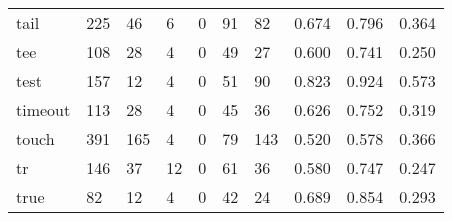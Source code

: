 \begin{longtable}{lp{2.0cm}p{2.0cm}p{2.0cm}p{2.0cm}p{2.0cm}p{2.0cm}p{2.0cm}p{2.0cm}p{2.0cm}}
tail      &                    225 &                                 46 &                                 6 &                                0 &                                91 &                              82 &                                0.674 &                                  0.796 &                                0.364 \\
tee       &                    108 &                                 28 &                                 4 &                                0 &                                49 &                              27 &                                0.600 &                                  0.741 &                                0.250 \\
test      &                    157 &                                 12 &                                 4 &                                0 &                                51 &                              90 &                                0.823 &                                  0.924 &                                0.573 \\
timeout   &                    113 &                                 28 &                                 4 &                                0 &                                45 &                              36 &                                0.626 &                                  0.752 &                                0.319 \\
touch     &                    391 &                                165 &                                 4 &                                0 &                                79 &                             143 &                                0.520 &                                  0.578 &                                0.366 \\
tr        &                    146 &                                 37 &                                12 &                                0 &                                61 &                              36 &                                0.580 &                                  0.747 &                                0.247 \\
true      &                     82 &                                 12 &                                 4 &                                0 &                                42 &                              24 &                                0.689 &                                  0.854 &                                0.293 \\

\end{longtable}
